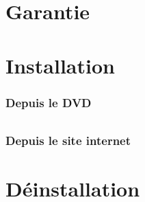 \documentclass[titlepage, 13px, a4paper]{report}
\begin{document}
\AddToShipoutPicture*{\BackgroundPic}

\maketitle
\tableofcontents


\part{Garantie} 



\newpage


\part{Installation} 

\section{Depuis le DVD}
\paragraph*{} \hspace{0pt}

\section{Depuis le site internet}
\paragraph*{} \hspace{0pt}


\newpage


\part{Déinstallation} 



\newpage
\end{document}
